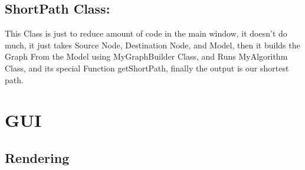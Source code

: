 \documentclass[a4paper, 12pt, english]{book}
\begin{document}
\subsection{ ShortPath Class:}
This Class is just to reduce amount of code in the main window, it doesn’t do much, it just takes Source Node, Destination Node, and Model, then it builds the Graph From the Model using MyGraphBuilder Class, and Runs MyAlgorithm Class, and its special Function getShortPath, finally the output is our shortest path.



\section{GUI}
\subsection{Rendering}
\end{document}

